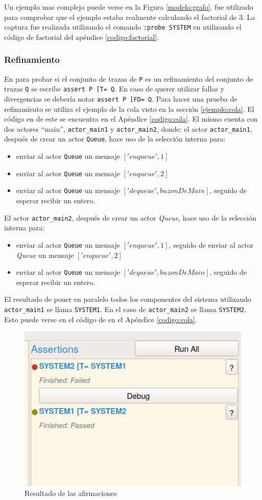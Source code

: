Un ejemplo mas complejo puede verse en la Figura \ref{modelo:grafo}, fue utilizado para comprobar que el ejemplo estaba realmente calculando el factorial de 3. La captura fue realizada utilizando el comando \verb=:probe SYSTEM= en \FDR utilizando el código de factorial del apéndice \ref{codigo:factorial}.

\subsubsection*{Refinamiento}

En \FDR para probar si el conjunto de trazas de \verb=P= es un refinamiento del conjunto de trazas \verb=Q= se escribe \verb$assert P [T= Q$. En caso de querer utilizar fallas y divergencias se debería notar \verb$assert P [FD= Q$. Para hacer una prueba de refinamiento se utiliza el ejemplo de la cola visto en la sección \ref{ejemplo:cola}. El código en \CSPm de este se encuentra en el Apéndice \ref{codigo:cola}. El mismo cuenta con dos actores ``main'', \verb=actor_main1= y \verb=actor_main2=, donde: el actor \verb=actor_main1=, después de crear un actor \verb=Queue=, hace uso de la selección interna para:
\begin{itemize}
 \item enviar al actor \verb=Queue= un mensaje $['enqueue', 1]$
 \item enviar al actor \verb=Queue= un mensaje $['enqueue', 2]$
 \item enviar al actor \verb=Queue= un mensaje $['dequeue', buzonDeMain]$, seguido de esperar recibir un entero.
\end{itemize}

El actor \verb=actor_main2=, después de crear un actor \textit{Queue}, hace uso de la selección interna para:
\begin{itemize}
 \item enviar al actor \verb=Queue= un mensaje $['enqueue', 1]$, seguido de enviar al actor \textit{Queue} un mensaje $['enqueue', 2]$
 \item enviar al actor \verb=Queue= un mensaje $['dequeue', buzonDeMain]$, seguido de esperar recibir un entero.
\end{itemize}

El resultado de poner en paralelo todos los componentes del sistema utilizando \verb=actor_main1= se llama \verb=SYSTEM1=. En el caso de \verb=actor_main2= se llama \verb=SYSTEM2=. Esto puede verse en el código de \CSPm en el Apéndice \ref{codigo:cola}.

\begin{figure}
\begin{center}
\includegraphics[width=5 cm]{img/trazas.png}
\caption{Resultado de las afirmaciones}\label{modelo:verifica}
\end{center}
\end{figure}

